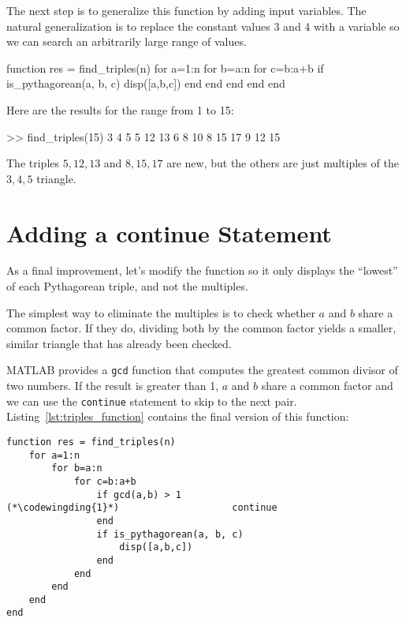 
The next step is to generalize this function by adding input
variables.  The natural generalization is to replace the constant
values 3 and 4 with a variable so we can search an arbitrarily large
range of values.

\begin{code}
function res = find_triples(n)
    for a=1:n
        for b=a:n
            for c=b:a+b
                if is_pythagorean(a, b, c)
                    disp([a,b,c])
                end
            end
        end
    end
end
\end{code}

Here are the results for the range from 1 to 15:

\begin{code}
>> find_triples(15)
     3     4     5
     5    12    13
     6     8    10
     8    15    17
     9    12    15
\end{code}

The triples $5,12,13$ and $8,15,17$ are new, but the others are just multiples of the $3,4,5$ triangle.

\section{Adding a continue Statement}


As a final improvement, let's modify the function so it only
displays the ``lowest'' of each Pythagorean triple, and not the
multiples.

The simplest way to eliminate the multiples is to check whether
$a$ and $b$ share a common factor.  If they do, dividing both
by the common factor yields a smaller, similar triangle that has
already been checked.


MATLAB provides a {\tt gcd} function that computes the greatest common
divisor of two numbers.  If the result is greater than 1,
$a$ and $b$ share a common factor and we can use the {\tt continue}
statement to skip to the next pair. Listing~\ref{lst:triples_function} contains the final version of this function:

\begin{lstlisting}[caption={Our final Pythagorean triples function}, label={lst:triples_function}] 
function res = find_triples(n)
    for a=1:n
        for b=a:n
            for c=b:a+b
                if gcd(a,b) > 1
(*\codewingding{1}*)	                continue
                end
                if is_pythagorean(a, b, c)
                    disp([a,b,c])
                end
            end
        end
    end
end
\end{lstlisting}


